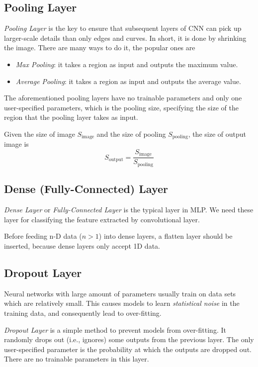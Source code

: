 \documentclass{note}
\begin{document}
\subsection{Pooling Layer}

\textit{Pooling Layer} is the key to ensure that subsequent layers of CNN can pick up larger-scale details than only edges and curves. In short, it is done by shrinking the image. There are many ways to do it, the popular ones are
\begin{itemize}
    \item \textit{Max Pooling}: it takes a region as input and outputs the maximum value.
    \item \textit{Average Pooling}: it takes a region as input and outputs the average value.
\end{itemize}

The aforementioned pooling layers have no trainable parameters and only one user-specified parameters, which is the pooling size, specifying the size of the region that the pooling layer takes as input.

Given the size of image $S_\text{image}$ and the size of pooling $S_\text{pooling}$, the size of output image is
$$
S_\text{output} = \frac{S_\text{image}}{S_\text{pooling}}
$$

\subsection{Dense (Fully-Connected) Layer}

\textit{Dense Layer} or \textit{Fully-Connected Layer} is the typical layer in MLP. We need these layer for classifying the feature extracted by convolutional layer.

\begin{important}
    Before feeding n-D data ($n > 1$) into dense layers, a flatten layer should be inserted, because dense layers only accept 1D data.
\end{important}

\subsection{Dropout Layer}

Neural networks with large amount of parameters usually train on data sets which are relatively small. This causes models to learn \textit{statistical noise} in the training data, and consequently lead to over-fitting. 

\textit{Dropout Layer} is a simple method to prevent models from over-fitting. It randomly drops out (i.e., ignores) some outputs from the previous layer. The only user-specified parameter is the probability at which the outputs are dropped out. There are no trainable parameters in this layer.
\end{document}
